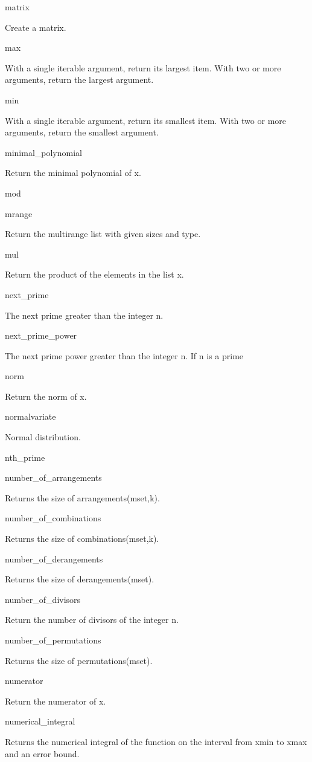 \documentclass[12pt,oneside]{book}
\begin{document}
matrix

Create a matrix.

max

With a single iterable argument, return its largest item. With two or more arguments, return the largest argument.

min

With a single iterable argument, return its smallest item. With two or more arguments, return the smallest argument.

minimal\_polynomial

Return the minimal polynomial of x.

mod


mrange

Return the multirange list with given sizes and type.

mul

Return the product of the elements in the list x.

next\_prime

The next prime greater than the integer n.

next\_prime\_power

The next prime power greater than the integer n. If n is a prime

norm

Return the norm of x.

normalvariate

Normal distribution.

nth\_prime


number\_of\_arrangements

Returns the size of arrangements(mset,k).

number\_of\_combinations

Returns the size of combinations(mset,k).

number\_of\_derangements

Returns the size of derangements(mset).

number\_of\_divisors

Return the number of divisors of the integer n.

number\_of\_permutations

Returns the size of permutations(mset).

numerator

Return the numerator of x.

numerical\_integral

Returns the numerical integral of the function on the interval from xmin to xmax and an error bound.
\end{document}

